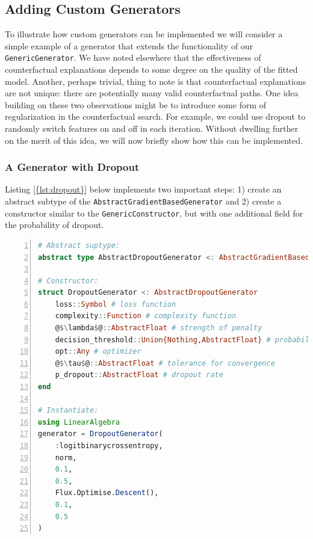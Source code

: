 \documentclass{juliacon}
\begin{document}
\hypertarget{adding-custom-generators}{%
\subsection{Adding Custom Generators}\label{adding-custom-generators}}

To illustrate how custom generators can be implemented we will consider
a simple example of a generator that extends the functionality of our
\texttt{GenericGenerator}. We have noted elsewhere that the
effectiveness of counterfactual explanations depends to some degree on
the quality of the fitted model. Another, perhaps trivial, thing to note
is that counterfactual explanations are not unique: there are
potentially many valid counterfactual paths. One idea building on these
two observations might be to introduce some form of regularization in
the counterfactual search. For example, we could use dropout to randomly
switch features on and off in each iteration. Without dwelling further
on the merit of this idea, we will now briefly show how this can be
implemented.

\hypertarget{a-generator-with-dropout}{%
\subsubsection{A Generator with
Dropout}\label{a-generator-with-dropout}}

Listing \ref{{lst:dropout}} below implements two important steps: 1)
create an abstract subtype of the
\texttt{AbstractGradientBasedGenerator} and 2) create a constructor
similar to the \texttt{GenericConstructor}, but with one additional
field for the probability of dropout.

\begin{lstlisting}[language=Julia, escapechar=@, numbers=left, label={lst:dropout}, caption={.}]
# Abstract suptype:
abstract type AbstractDropoutGenerator <: AbstractGradientBasedGenerator end

# Constructor:
struct DropoutGenerator <: AbstractDropoutGenerator
    loss::Symbol # loss function
    complexity::Function # complexity function
    @$\lambda$@::AbstractFloat # strength of penalty
    decision_threshold::Union{Nothing,AbstractFloat} # probability threshold
    opt::Any # optimizer
    @$\tau$@::AbstractFloat # tolerance for convergence
    p_dropout::AbstractFloat # dropout rate
end

# Instantiate:
using LinearAlgebra
generator = DropoutGenerator(
    :logitbinarycrossentropy,
    norm,
    0.1,
    0.5,
    Flux.Optimise.Descent(),
    0.1,
    0.5
)
\end{lstlisting}
\end{document}
